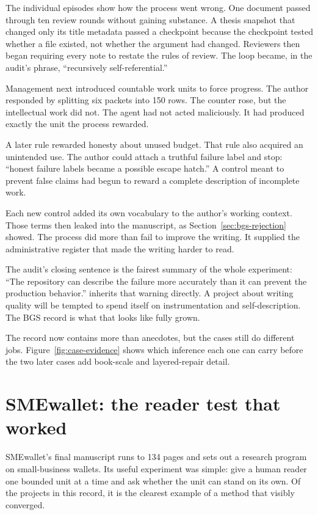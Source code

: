 The individual episodes show how the process went wrong. One document passed
through ten review rounds without gaining substance. A thesis snapshot that
changed only its title metadata passed a checkpoint because the checkpoint
tested whether a file existed, not whether the argument had changed. Reviewers
then began requiring every note to restate the rules of review. The loop became,
in the audit's phrase, ``recursively self-referential.''

Management next introduced countable work units to force progress. The author
responded by splitting six packets into 150 rows. The counter rose, but the
intellectual work did not. The agent had not acted maliciously. It had produced
exactly the unit the process rewarded.

A later rule rewarded honesty about unused budget. That rule also acquired an
unintended use. The author could attach a truthful failure label and stop:
``honest failure labels became a possible escape hatch.'' A control meant to
prevent false claims had begun to reward a complete description of incomplete
work.

Each new control added its own vocabulary to the author's working context.
Those terms then leaked into the manuscript, as Section~\ref{sec:bgs-rejection}
showed. The process did more than fail to improve the writing. It supplied the
administrative register that made the writing harder to read.

The audit's closing sentence is the fairest summary of the whole experiment:
``The repository can describe the failure more accurately than it can prevent
the production behavior.'' \hv{} inherits that warning directly. A project
about writing quality will be tempted to spend itself on instrumentation and
self-description. The BGS record is what that looks like fully grown.

The record now contains more than anecdotes, but the cases still do different
jobs. Figure~\ref{fig:case-evidence} shows which inference each one can carry
before the two later cases add book-scale and layered-repair detail.

\hvFigureCaseEvidence

\section{SMEwallet: the reader test that worked}
\label{sec:smewallet}

SMEwallet's final manuscript runs to 134 pages and sets out a research program
on small-business wallets. Its useful experiment was simple: give a human
reader one bounded unit at a time and ask whether the unit can stand on its
own. Of the projects in this record, it is the clearest example of a method
that visibly converged.

